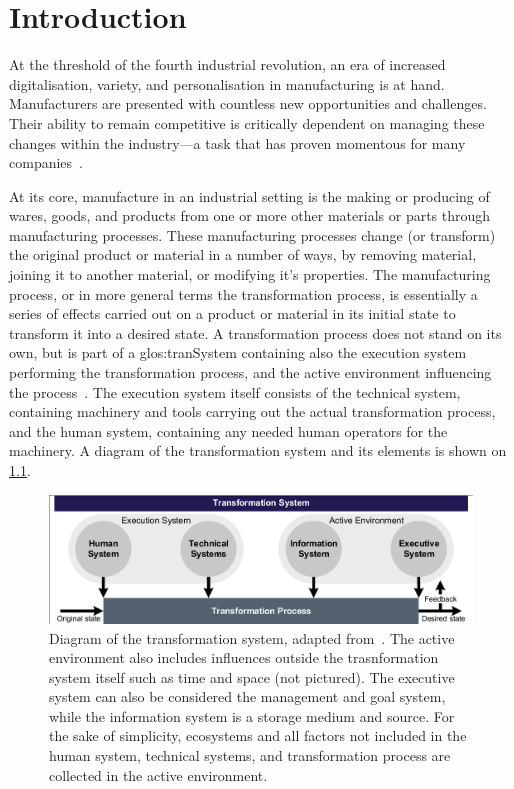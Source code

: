 \chapter{Introduction}\label{chp:Introduction}
At the threshold of the fourth industrial revolution, an era of increased digitalisation, variety, and personalisation in manufacturing is at hand.
Manufacturers are presented with countless new opportunities and challenges.
Their ability to remain competitive is critically dependent on managing these changes within the industry---a task that has proven momentous for many companies~\parencite{ElMaraghy2013629}.

At its core, manufacture in an industrial setting is the making or producing of wares, goods, and products from one or more other materials or parts through manufacturing processes.
These manufacturing processes change (or transform) the original product or material in a number of ways, \eg{} by removing material, joining it to another material, or modifying it's properties.
The manufacturing process, or in more general terms the transformation process, is essentially a series of effects carried out on a product or material in its initial state to transform it into a desired state.
A transformation process does not stand on its own, but is part of a \gls{glos:tranSystem} containing also the execution system performing the transformation process, and the active environment influencing the process~\parencite{Hubka88}.
The execution system itself consists of the technical system, containing machinery and tools carrying out the actual transformation process, and the human system, containing any needed human operators for the machinery.
A diagram of the transformation system and its elements is shown on \cref{fig:transfSystem}.
\begin{figure}[tb]
	\includegraphics[width=\textwidth, trim=2 2 2 2, clip]{mainmatter/introduction/figures/TTS.pdf}
	\caption[Diagram of the transformation system.]
	{Diagram of the transformation system, adapted from~\textcite{Hubka88}.
	The active environment also includes influences outside the trasnformation system itself such as time and space (not pictured).
	The executive system can also be considered the management and goal system, while the information system is a storage medium and source.
	For the sake of simplicity, ecosystems and all factors not included in the human system, technical systems, and transformation process are collected in the active environment.}\label{fig:transfSystem}
\end{figure}

